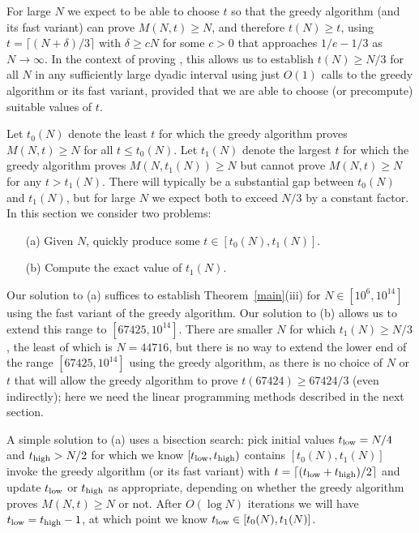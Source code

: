 \documentclass[12pt,a4paper,reqno]{amsart}
\numberwithin{equation}{section}
\theoremstyle{plain}
\theoremstyle{definition}
\begin{document}
For large $N$ we expect to be able to choose $t$ so that the greedy algorithm (and its fast variant) can prove $M(N,t)\ge N$, and therefore $t(N)\ge t$, using $t=\lceil (N+\delta)/3\rceil$ with $\delta \ge cN$ for some $c>0$ that approaches $1/e-1/3$ as $N\to \infty$.  In the context of proving , this allows us to establish $t(N)\ge N/3$ for all $N$ in any sufficiently large dyadic interval using just $O(1)$ calls to the greedy algorithm or its fast variant, provided that we are able to choose (or precompute) suitable values of $t$.

Let $t_0(N)$ denote the least $t$ for which the greedy algorithm proves $M(N,t)\ge N$ for all $t\le t_0(N)$.  Let $t_1(N)$ denote the largest $t$ for which the greedy algorithm proves $M(N,t_1(N))\ge N$ but cannot prove $M(N,t)\ge N$ for any $t>t_1(N)$.  There will typically be a substantial gap between $t_0(N)$ and $t_1(N)$, but for large $N$ we expect both to exceed $N/3$ by a constant factor.  In this section we consider two problems:

\begin{itemize}
\setlength{\itemsep}{4pt}
\item[(a)] Given $N$, quickly produce some $t\in [t_0(N),t_1(N)]$.
\item[(b)] Compute the exact value of $t_1(N)$.
\end{itemize}

Our solution to (a) suffices to establish Theorem~\ref{main}(iii) for $N\in [10^6,10^{14}]$ using the fast variant of the greedy algorithm.
Our solution to (b) allows us to extend this range to $[67425,10^{14}]$.  There are smaller $N$ for which $t_1(N)\ge N/3$, the least of which is $N=44716$, but there is no way to extend the lower end of the range $[67425,10^{14}]$ using the greedy algorithm, as there is no choice of $N$ or $t$ that will allow the greedy algorithm to prove $t(67424) \ge 67424/3$ (even indirectly); here we need the linear programming methods described in the next section.

A simple solution to (a) uses a bisection search: pick initial values $t_{\rm low} = N/4$ and $t_{\rm high} > N/2$ for which we know $[t_{\rm low},t_{\rm high})$ contains $[t_0(N),t_1(N)]$ invoke the greedy algorithm (or its fast variant) with $t=\lceil(t_{\rm low}+t_{\rm high})/2\rceil$ and update $t_{\rm low}$ or $t_{\rm high}$ as appropriate, depending on whether the greedy algorithm proves $M(N,t)\ge N$ or not.  After $O(\log N)$ iterations we will have $t_{\rm low} = t_{\rm high}-1$, at which point we know $t_{\rm low}\in [t_0(N),t_1(N)]$.
\end{document}
